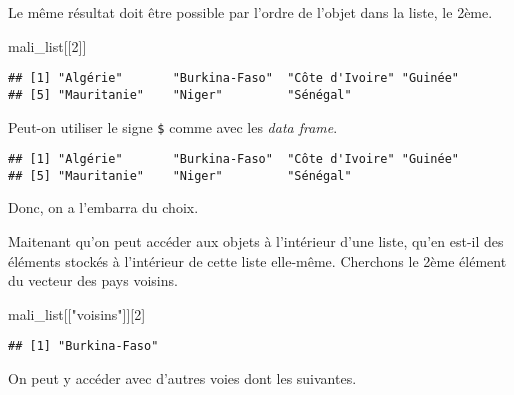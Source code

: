 \documentclass[]{book}
\newenvironment{Shaded}{\begin{snugshade}}{\end{snugshade}}
\newcommand{\DecValTok}[1]{\textcolor[rgb]{0.00,0.00,0.81}{#1}}
\newcommand{\StringTok}[1]{\textcolor[rgb]{0.31,0.60,0.02}{#1}}
\newcommand{\OperatorTok}[1]{\textcolor[rgb]{0.81,0.36,0.00}{\textbf{#1}}}
\newcommand{\NormalTok}[1]{#1}
\begin{document}
Le même résultat doit être possible par l'ordre de l'objet dans la
liste, le 2ème.

\begin{Shaded}
\begin{Highlighting}[]
\NormalTok{mali_list[[}\DecValTok{2}\NormalTok{]]}
\end{Highlighting}
\end{Shaded}

\begin{verbatim}
## [1] "Algérie"       "Burkina-Faso"  "Côte d'Ivoire" "Guinée"       
## [5] "Mauritanie"    "Niger"         "Sénégal"
\end{verbatim}

Peut-on utiliser le signe \texttt{\$} comme avec les \emph{data frame}.

\begin{Shaded}
\end{Shaded}

\begin{verbatim}
## [1] "Algérie"       "Burkina-Faso"  "Côte d'Ivoire" "Guinée"       
## [5] "Mauritanie"    "Niger"         "Sénégal"
\end{verbatim}

Donc, on a l'embarra du choix.

Maitenant qu'on peut accéder aux objets à l'intérieur d'une liste, qu'en
est-il des éléments stockés à l'intérieur de cette liste elle-même.
Cherchons le 2ème élément du vecteur des pays voisins.

\begin{Shaded}
\begin{Highlighting}[]
\NormalTok{mali_list[[}\StringTok{"voisins"}\NormalTok{]][}\DecValTok{2}\NormalTok{]}
\end{Highlighting}
\end{Shaded}

\begin{verbatim}
## [1] "Burkina-Faso"
\end{verbatim}

On peut y accéder avec d'autres voies dont les suivantes.

\begin{Shaded}
\end{Shaded}
\end{document}
